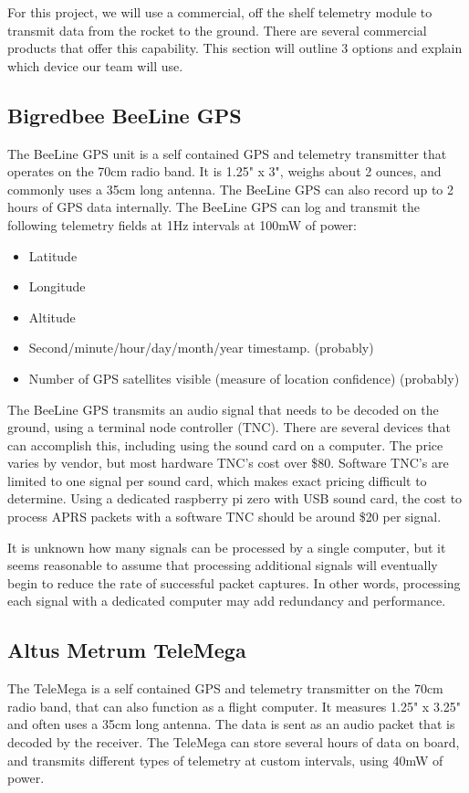 \documentclass[onecolumn, draftclsnofoot, 10pt, compsoc]{IEEEtran}
\begin{document}
For this project, we will use a commercial, off the shelf telemetry module to transmit data from the rocket to the ground.  There are several commercial products that offer this capability.  This section will outline 3 options and explain which device our team will use.

\subsection{Bigredbee BeeLine GPS}
The BeeLine GPS unit is a self contained GPS and telemetry transmitter that operates on the 70cm radio band.  It is 1.25" x 3", weighs about 2 ounces, and commonly uses a 35cm long antenna.  The BeeLine GPS can also record up to 2 hours of GPS data internally.  The BeeLine GPS can log and transmit the following telemetry fields at 1Hz intervals at 100mW of power:

\begin{itemize}
	\item Latitude
    \item Longitude
    \item Altitude
    \item Second/minute/hour/day/month/year timestamp. (probably)
    \item Number of GPS satellites visible (measure of location confidence) (probably)
\end{itemize}

The BeeLine GPS transmits an audio signal that needs to be decoded on the ground, using a terminal node controller (TNC).  There are several devices that can accomplish this, including using the sound card on a computer.  The price varies by vendor, but most hardware TNC's cost over \$80.  Software TNC's are limited to one signal per sound card, which makes exact pricing difficult to determine.  Using a dedicated raspberry pi zero with USB sound card, the cost to process APRS packets with a software TNC should be around \$20 per signal.

It is unknown how many signals can be processed by a single computer, but it seems reasonable to assume that processing additional signals will eventually begin to reduce the rate of successful packet captures.  In other words, processing each signal with a dedicated computer may add redundancy and performance.

\subsection{Altus Metrum TeleMega}
The TeleMega is a self contained GPS and telemetry transmitter on the 70cm radio band, that can also function as a flight computer.  It measures 1.25" x 3.25" and often uses a 35cm long antenna. The data is sent as an audio packet that is decoded by the receiver.  The TeleMega can store several hours of data on board, and transmits different types of telemetry at custom intervals, using 40mW of power.
\end{document}
